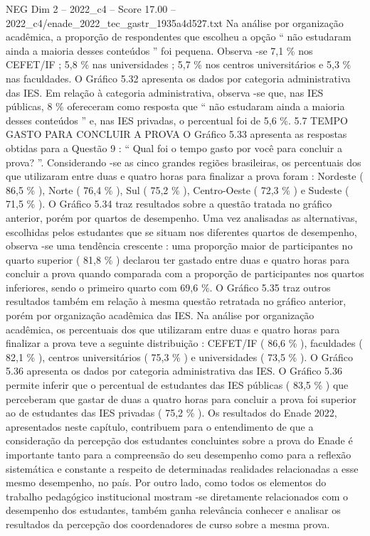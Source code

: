 \begin{textsample}{NEG Dim 2 – 2022\_c4 – Score 17.00 – 2022\_c4/enade\_2022\_tec\_gastr\_1935a4d527.txt}
Na análise por organização acadêmica, a proporção de respondentes que escolheu a opção “ não estudaram ainda a maioria desses conteúdos ” foi pequena.
Observa -se 7,1 \% nos CEFET/IF ; 5,8 \% nas universidades ; 5,7 \% nos centros universitários e 5,3 \% nas faculdades.
O Gráfico 5.32 apresenta os dados por categoria administrativa das IES.
Em relação à categoria administrativa, observa -se que, nas IES públicas, 8 \% ofereceram como resposta que “ não estudaram ainda a maioria desses conteúdos ” e, nas IES privadas, o percentual foi de 5,6 \%. 5.7 TEMPO GASTO PARA CONCLUIR A PROVA O Gráfico 5.33 apresenta as respostas obtidas para a Questão 9 : “ Qual foi o tempo gasto por você para concluir a prova? ”.
Considerando -se as cinco grandes regiões brasileiras, os percentuais dos que utilizaram entre duas e quatro horas para finalizar a prova foram : Nordeste ( 86,5 \% ), Norte ( 76,4 \% ), Sul ( 75,2 \% ), Centro-Oeste ( 72,3 \% ) e Sudeste ( 71,5 \% ).
O Gráfico 5.34 traz resultados sobre a questão tratada no gráfico anterior, porém por quartos de desempenho.
Uma vez analisadas as alternativas, escolhidas pelos estudantes que se situam nos diferentes quartos de desempenho, observa -se uma tendência crescente : uma proporção maior de participantes no quarto superior ( 81,8 \% ) declarou ter gastado entre duas e quatro horas para concluir a prova quando comparada com a proporção de participantes nos quartos inferiores, sendo o primeiro quarto com 69,6 \%.
O Gráfico 5.35 traz outros resultados também em relação à mesma questão retratada no gráfico anterior, porém por organização acadêmica das IES.
Na análise por organização acadêmica, os percentuais dos que utilizaram entre duas e quatro horas para finalizar a prova teve a seguinte distribuição : CEFET/IF ( 86,6 \% ), faculdades ( 82,1 \% ), centros universitários ( 75,3 \% ) e universidades ( 73,5 \% ).
O Gráfico 5.36 apresenta os dados por categoria administrativa das IES.
O Gráfico 5.36 permite inferir que o percentual de estudantes das IES públicas ( 83,5 \% ) que perceberam que gastar de duas a quatro horas para concluir a prova foi superior ao de estudantes das IES privadas ( 75,2 \% ).
Os resultados do Enade 2022, apresentados neste capítulo, contribuem para o entendimento de que a consideração da percepção dos estudantes concluintes sobre a prova do Enade é importante tanto para a compreensão do seu desempenho como para a reflexão sistemática e constante a respeito de determinadas realidades relacionadas a esse mesmo desempenho, no país.
Por outro lado, como todos os elementos do trabalho pedagógico institucional mostram -se diretamente relacionados com o desempenho dos estudantes, também ganha relevância conhecer e analisar os resultados da percepção dos coordenadores de curso sobre a mesma prova.

\end{textsample}

